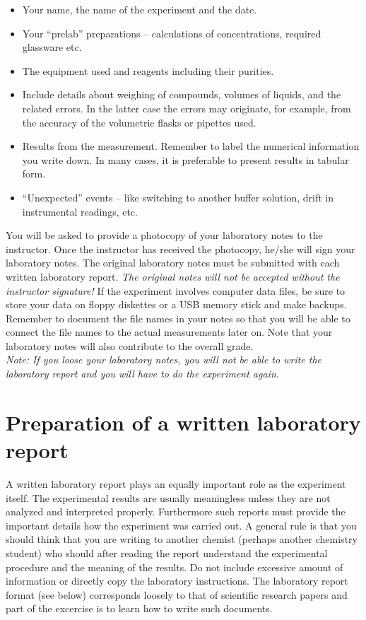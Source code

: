 \documentclass[byrevtex,amssymb,aps,pra,floatfix,letterpaper]{revtex4}
\begin{document}
\begin{itemize}
\item Your name, the name of the experiment and the date.
\item Your ``prelab'' preparations -- calculations of concentrations, required glassware etc.
\item The equipment used and reagents including their purities.
\item Include details about weighing of compounds, volumes of liquids, and the related errors. In the latter case the errors may originate, for example, from the accuracy of the volumetric flasks or pipettes used.
\item Results from the measurement. Remember to label the numerical information you write down. In many cases, it is preferable to present results in tabular form.
\item ``Unexpected'' events -- like switching to another buffer solution, drift in instrumental readings, etc.
\end{itemize}

\noindent
You will be asked to provide a photocopy of your laboratory notes to the instructor. Once the instructor has received the photocopy, he/she will sign your laboratory notes. The original laboratory notes must be submitted with each written laboratory report. \textit{The original notes will not be accepted without the instructor signature!} If the experiment involves computer data files, be sure to store your data on floppy diskettes or a USB memory stick and make backups. Remember to document the file names in your notes so that you will be able to connect the file names to the actual measurements later on. Note that your laboratory notes will also contribute to the overall grade.\\

\noindent
\textit{Note: If you loose your laboratory notes, you will not be able to write the laboratory report and you will have to do the experiment again}. 

\section{Preparation of a written laboratory report}
\label{sec4}

A written laboratory report plays an equally important role as the experiment itself. The experimental results are usually meaningless unless they are not analyzed and interpreted properly. Furthermore such reports must provide the important details how the experiment was carried out. A general rule is that you should think that you are writing to another chemist (perhaps another chemistry student) who should after reading the report understand the experimental procedure and the meaning of the results. Do not include excessive amount of information or directly copy the laboratory instructions. The laboratory report format (see below) corresponds loosely to that of scientific research papers and part of the excercise is to learn how to write such documents.
\end{document}
